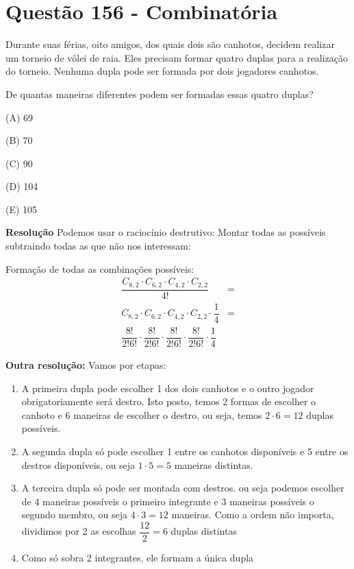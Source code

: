\section{Questão 156 - Combinatória}

Durante suas férias, oito amigos, dos quais dois são canhotos, decidem realizar um torneio de vôlei de raia.
Eles precisam formar quatro duplas para a realização do torneio. Nenhuma dupla pode ser formada por dois jogadores canhotos.

De quantas maneiras diferentes podem ser formadas essas quatro duplas?

\noindent (A)  69

\noindent (B)  70

\noindent (C)  90

\noindent (D)  104

\noindent (E) 105

\textbf{Resolução}
Podemos usar o raciocínio destrutivo: Montar todas as possíveis subtraindo todas as que não nos interessam:

Formação de todas as combinações possíveis: 
\begin{eqnarray*}
\dfrac{C_{8, 2} \cdot C_{6, 2} \cdot C_{4, 2} \cdot C_{2, 2}  }{4!} &= \\
C_{8, 2} \cdot C_{6, 2} \cdot C_{4, 2} \cdot C_{2, 2}  \cdot \dfrac{1}{4} &= \\
\dfrac{8!}{2! 6!} \cdot \dfrac{8!}{2! 6!} \cdot \dfrac{8!}{2! 6!} \cdot \dfrac{8!}{2! 6!} \cdot \dfrac{1}{4}
\end{eqnarray*}

\textbf{Outra resolução:}
Vamos por etapas:

\begin{enumerate}
    \item A primeira dupla pode escolher 1 dos dois canhotos e o outro jogador obrigatoriamente será destro. Isto posto, temos 2 formas de escolher o canhoto e 6 maneiras de escolher o destro, ou seja, temos $ 2 \cdot 6 = 12 $ duplas possíveis. 
    \item A segunda dupla só pode escolher 1 entre os canhotos disponíveis e 5 entre os destros disponíveis, ou seja $ 1 \cdot 5  = 5 $ maneiras distintas.
    \item A terceira dupla só pode ser montada com destros. ou seja podemos escolher de 4 maneiras possíveis o primeiro integrante e 3 maneiras possíveis o segundo membro, ou seja $ 4 \cdot 3  = 12 $ maneiras. Como a ordem não importa, dividimos por 2 as escolhas $ \dfrac{12}{2} = 6$ duplas distintas
    \item Como só sobra 2 integrantes, ele formam a única dupla
\end{enumerate}

